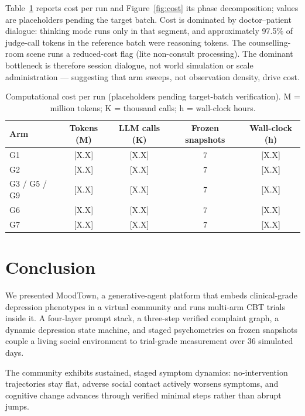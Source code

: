 \documentclass[10pt]{article}
\newcommand{\sys}{MoodTown}
\begin{document}
Table~\ref{tab:cost} reports cost per run and Figure~\ref{fig:cost} its phase decomposition; values are placeholders pending the target batch.
Cost is dominated by doctor--patient dialogue: thinking mode runs only in that segment, and approximately 97.5\% of judge-call tokens in the reference batch were reasoning tokens.
The counselling-room scene runs a reduced-cost flag (lite non-consult processing).
The dominant bottleneck is therefore session dialogue, not world simulation or scale administration --- suggesting that arm sweeps, not observation density, drive cost.

\begin{table}[t]
\centering
\caption{Computational cost per run (placeholders pending target-batch verification).
M = million tokens; K = thousand calls; h = wall-clock hours.}
\label{tab:cost}
\small
\begin{tabular}{@{}lcccc@{}}
\toprule
Arm & Tokens (M) & LLM calls (K) & Frozen snapshots & Wall-clock (h) \\
\midrule
G1 & [X.X] & [X.X] & 7 & [X.X] \\
G2 & [X.X] & [X.X] & 7 & [X.X] \\
G3 / G5 / G9 & [X.X] & [X.X] & 7 & [X.X] \\
G6 & [X.X] & [X.X] & 7 & [X.X] \\
G7 & [X.X] & [X.X] & 7 & [X.X] \\
\bottomrule
\end{tabular}
\end{table}

\section{Conclusion}\label{sec:conclusion}

We presented \sys, a generative-agent platform that embeds clinical-grade depression phenotypes in a virtual community and runs multi-arm CBT trials inside it.
A four-layer prompt stack, a three-step verified complaint graph, a dynamic depression state machine, and staged psychometrics on frozen snapshots couple a living social environment to trial-grade measurement over 36 simulated days.

The community exhibits sustained, staged symptom dynamics: no-intervention trajectories stay flat, adverse social contact actively worsens symptoms, and cognitive change advances through verified minimal steps rather than abrupt jumps.
\end{document}
